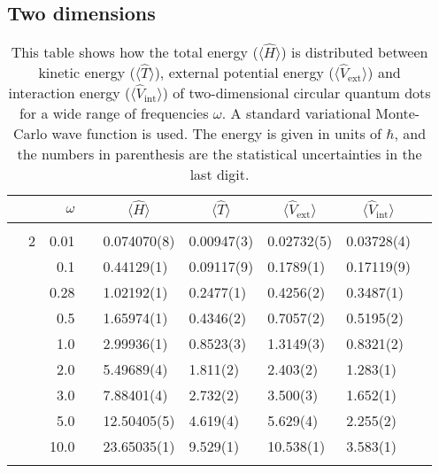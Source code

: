 \subsection{Two dimensions}
\begin{table}[H]
	\caption{This table shows how the total energy ($\langle\hat{H}\rangle$) is distributed between kinetic energy ($\langle\hat{T}\rangle$), external potential energy ($\langle\hat{V}_{\text{ext}}\rangle$) and interaction energy ($\langle\hat{V}_{\text{int}}\rangle$) of two-dimensional circular quantum dots for a wide range of frequencies $\omega$. A standard variational Monte-Carlo wave function is used. The energy is given in units of $\hbar$, and the numbers in parenthesis are the statistical uncertainties in the last digit.}
	\label{tab:splitfrequencyQDVMC}
	\begin{tabularx}{\textwidth}{R{1cm}rrcR{2.3cm}R{2.3cm}R{2.3cm}R{2.3cm}R{1cm}} \hline\hline
		&\makecell{\\ \phantom{$N$} \\ \phantom{=}} & $\omega$ &&  &  &  &  & \\ \hline \\
		&2 & 0.01 && 0.074070(8) & 0.00947(3) & 0.02732(5) & 0.03728(4) \\
		&& 0.1 && 0.44129(1) & 0.09117(9) & 0.1789(1) & 0.17119(9) \\
		&& 0.28 && 1.02192(1) & 0.2477(1) & 0.4256(2) & 0.3487(1) \\
		&& 0.5 && 1.65974(1) & 0.4346(2) & 0.7057(2) & 0.5195(2)\\
		&& 1.0 && 2.99936(1) & 0.8523(3) & 1.3149(3) & 0.8321(2)\\
		&& 2.0 && 5.49689(4) & 1.811(2) & 2.403(2) & 1.283(1) \\
		&& 3.0 && 7.88401(4) & 2.732(2) & 3.500(3) & 1.652(1) \\ 
		&& 5.0 && 12.50405(5) & 4.619(4) & 5.629(4) & 2.255(2) \\
		&& 10.0 && 23.65035(1) & 9.529(1) & 10.538(1) & 3.583(1) \\
		\hdashline \\
		

\end{tabularx}
\end{table}
